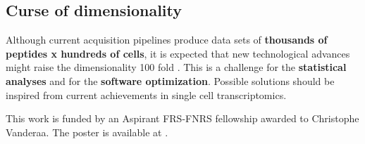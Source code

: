 \documentclass{article}
\begin{document}
\begin{multicols}{2}
\noindent
\begin{minipage}[h]{\linewidth}
  \subsection*{Curse of dimensionality}
  \large
  Although current acquisition pipelines produce data sets of \textbf{thousands of peptides x hundreds of cells}, it is expected that new technological advances might raise the dimensionality 100 fold \cite{Specht2019-jm}. This is a challenge for the \textbf{statistical analyses} and for the \textbf{software optimization}. Possible solutions should be inspired from current achievements in single cell transcriptomics. 
\end{minipage}

\vspace{0.5cm}
\noindent
This work is funded by an Aspirant FRS-FNRS fellowship awarded to Christophe Vanderaa. The poster is available at {\color{blue}{https://github.com/cvanderaa/EuroBioc2019-Poster}}.



\scriptsize
 


\end{multicols}
\end{document}

